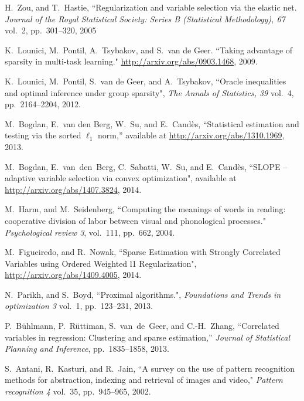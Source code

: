 \documentclass[journal]{IEEEtran}
\newcommand{\fix}{\marginpar{FIX}}
\begin{document}
\begin{thebibliography}{20}
		
		
		
		H.~Zou, and T.~Hastie, ``Regularization and variable selection via the elastic net. \emph{Journal of the Royal Statistical Society: Series B (Statistical Methodology), 67} vol.~2, pp.~301--320, 2005
		
		 K.~Lounici, M.~Pontil, A.~Tsybakov, and S.~van de Geer. ``Taking advantage of sparsity in multi-task learning." \url{http://arxiv.org/abs/0903.1468}, 2009.
		
		 K.~Lounici, M.~Pontil, S.~van de Geer, and A.~Tsybakov, ``Oracle inequalities and optimal inference under group sparsity", \emph{The Annals of Statistics, 39} vol.~4, pp.~2164--2204, 2012.
		
		
		M.~Bogdan, E.~van den Berg, W.~Su, and E.~Cand\`{e}s, ``Statistical estimation and testing via the sorted $\ell_1$ norm,''  available at \url{http://arxiv.org/abs/1310.1969}, 2013.
		
		M.~Bogdan, E.~van~den~Berg, C.~Sabatti, W.~Su, and E.~Cand\`{e}s, ``SLOPE -- adaptive variable selection via convex optimization", available at \url{http://arxiv.org/abs/1407.3824}, 2014.
		
		M.~Harm, and M.~Seidenberg, ``Computing the meanings of words in reading: cooperative division of labor between visual and phonological processes." {\em Psychological review 3}, vol.~111, pp.~662, 2004.
		
		 M.~Figueiredo, and R.~Nowak, ``Sparse Estimation with Strongly Correlated Variables using Ordered Weighted l1 Regularization", \url{http://arxiv.org/abs/1409.4005}, 2014.
		
		 N.~Parikh, and S.~Boyd, ``Proximal algorithms.", {\em Foundations and Trends in optimization 3} vol.~1, pp.~123--231, 2013.
		
		P.~B\"{u}hlmann, P.~R\"{u}ttiman, S.~van~de~Geer, and C.-H.~Zhang, ``Correlated variables in regression: Clustering and sparse estimation,'' {\em Journal of Statistical Planning and Inference}, pp.~1835--1858, 2013.
		
		S.~Antani, R.~Kasturi, and R.~Jain, ``A survey on the use of pattern recognition methods for abstraction, indexing and retrieval of images and video," {\em Pattern recognition 4} vol.~35, pp.~945--965, 2002.
		

\end{thebibliography}
\end{document}
